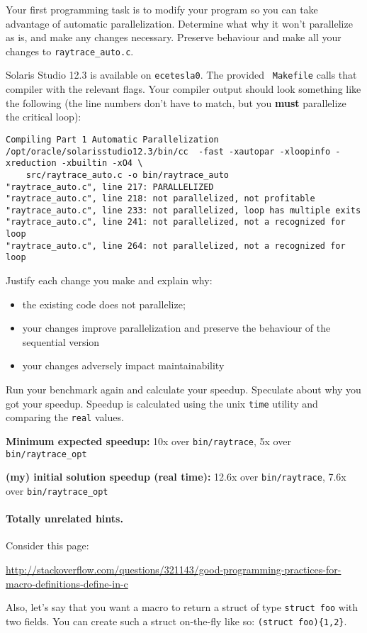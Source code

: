 \documentclass[letterpaper,10pt]{article}
\begin{document}
Your first programming task is to modify your program so you can take
advantage of automatic parallelization. Determine what why it won't
parallelize as is, and make any changes necessary. Preserve behaviour
and make all your changes to {\tt raytrace\_auto.c}.

Solaris Studio 12.3 is available on {\tt ecetesla0}. The provided {\tt
  Makefile} calls that compiler with the relevant flags. Your compiler
output should look something like the following (the line numbers
don't have to match, but you {\bf must} parallelize the critical loop):

\begin{lstlisting}
Compiling Part 1 Automatic Parallelization
/opt/oracle/solarisstudio12.3/bin/cc  -fast -xautopar -xloopinfo -xreduction -xbuiltin -xO4 \
    src/raytrace_auto.c -o bin/raytrace_auto
"raytrace_auto.c", line 217: PARALLELIZED
"raytrace_auto.c", line 218: not parallelized, not profitable
"raytrace_auto.c", line 233: not parallelized, loop has multiple exits
"raytrace_auto.c", line 241: not parallelized, not a recognized for loop
"raytrace_auto.c", line 264: not parallelized, not a recognized for loop
\end{lstlisting}

Justify each change you make and explain why:
\begin{itemize}
\item the existing code does not parallelize;
\item your changes improve parallelization and preserve the behaviour of the sequential version
\item your changes adversely impact maintainability
\end{itemize}

Run your benchmark again and calculate your speedup. Speculate about why you got your speedup. Speedup is calculated using the unix \texttt{time} utility and comparing the \texttt{real} values. 

\squishlist
  \item {\bf Minimum expected speedup:} 10x over \texttt{bin/raytrace}, 5x over \texttt{bin/raytrace\_opt}
  \item {\bf (my) initial solution speedup (real time):} 12.6x over \texttt{bin/raytrace}, 7.6x over \texttt{bin/raytrace\_opt}
\squishend

\paragraph{Totally unrelated hints.} Consider this page:
\begin{center}
  \scriptsize \url{http://stackoverflow.com/questions/321143/good-programming-practices-for-macro-definitions-define-in-c}
\end{center}
Also, let's say that you want a macro to return a struct of type {\tt struct foo} with
two fields. You can create such a struct on-the-fly like so: \verb!(struct foo){1,2}!.
\end{document}

